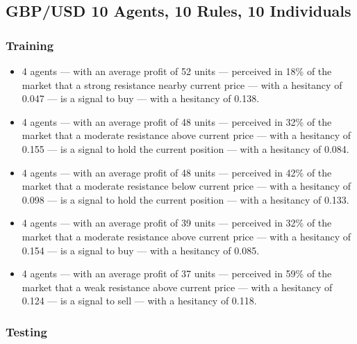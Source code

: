 \subsection{GBP/USD 10 Agents, 10 Rules, 10 Individuals}
\label{results:interpretation-gbp-usd-10agents-10rules-10individuals}


\subsubsection{Training}

{\small
  \begin{itemize}
  \item 4 agents — with an average profit of 52 units — perceived in 18\% of the
    market that a strong resistance nearby current price — with a hesitancy of
    0.047 — is a signal to buy — with a hesitancy of 0.138.
  \item 4 agents — with an average profit of 48 units — perceived in 32\% of the
    market that a moderate resistance above current price — with a hesitancy of
    0.155 — is a signal to hold the current position — with a hesitancy of
    0.084.
  \item 4 agents — with an average profit of 48 units — perceived in 42\% of the
    market that a moderate resistance below current price — with a hesitancy of
    0.098 — is a signal to hold the current position — with a hesitancy of
    0.133.
  \item 4 agents — with an average profit of 39 units — perceived in 32\% of the
    market that a moderate resistance above current price — with a hesitancy of
    0.154 — is a signal to buy — with a hesitancy of 0.085.
  \item 4 agents — with an average profit of 37 units — perceived in 59\% of the
    market that a weak resistance above current price — with a hesitancy of
    0.124 — is a signal to sell — with a hesitancy of 0.118.
  \end{itemize}
}

\subsubsection{Testing}

